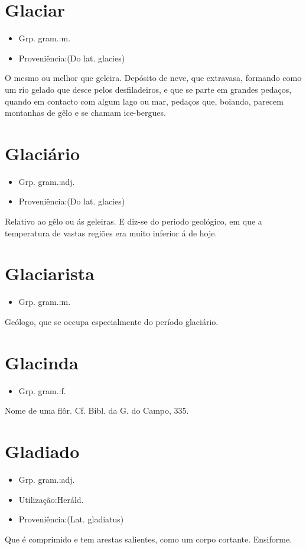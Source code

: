 \section{Glaciar}
\begin{itemize}
\item {Grp. gram.:m.}
\end{itemize}
\begin{itemize}
\item {Proveniência:(Do lat. \textunderscore glacies\textunderscore )}
\end{itemize}
O mesmo ou melhor que \textunderscore geleira\textunderscore .
Depósito de neve, que extravasa, formando como um rio gelado que desce pelos desfiladeiros, e que se parte em grandes pedaços, quando em contacto com algum lago ou mar, pedaços que, boiando, parecem montanhas de gêlo e se chamam \textunderscore ice-bergues\textunderscore .
\section{Glaciário}
\begin{itemize}
\item {Grp. gram.:adj.}
\end{itemize}
\begin{itemize}
\item {Proveniência:(Do lat. \textunderscore glacies\textunderscore )}
\end{itemize}
Relativo ao gêlo ou ás geleiras.
E diz-se do periodo geológico, em que a temperatura de vastas regiões era muito inferior á de hoje.
\section{Glaciarista}
\begin{itemize}
\item {Grp. gram.:m.}
\end{itemize}
Geólogo, que se occupa especialmente do período glaciário.
\section{Glacinda}
\begin{itemize}
\item {Grp. gram.:f.}
\end{itemize}
Nome de uma flôr. Cf. \textunderscore Bibl. da G. do Campo\textunderscore , 335.
\section{Gladiado}
\begin{itemize}
\item {Grp. gram.:adj.}
\end{itemize}
\begin{itemize}
\item {Utilização:Heráld.}
\end{itemize}
\begin{itemize}
\item {Proveniência:(Lat. \textunderscore gladiatus\textunderscore )}
\end{itemize}
Que é comprimido e tem arestas salientes, como um corpo cortante.
Ensiforme.

